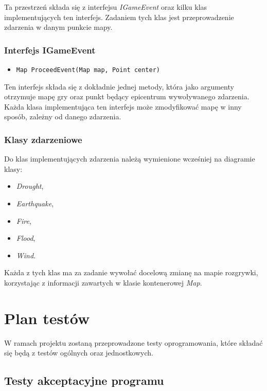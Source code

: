 \documentclass[a4paper,12pt]{article}
\newcommand\tab[1][0.6cm]{\hspace*{#1} }
\begin{document}
\tab Ta przestrzeń składa się z interfejsu \textit{IGameEvent} oraz kilku klas implementujących ten interfejs. Zadaniem tych klas jest przeprowadzenie zdarzenia w danym punkcie mapy.

\subsubsection{Interfejs IGameEvent}

\begin{itemize}
\item \begin{lstlisting}
Map ProceedEvent(Map map, Point center)
\end{lstlisting}
\end{itemize}

Ten interfejs składa się z dokładnie jednej metody, która jako argumenty otrzymuje mapę gry oraz punkt będący epicentrum wywoływanego zdarzenia. Każda klasa implementująca ten interfejs może zmodyfikować mapę w inny sposób, zależny od danego zdarzenia.


\subsubsection{Klasy zdarzeniowe}

\tab Do klas implementujących zdarzenia należą wymienione wcześniej na diagramie klasy:

\begin{itemize}
\item \textit{Drought},
\item \textit{Earthquake},
\item \textit{Fire},
\item \textit{Flood},
\item \textit{Wind}.
\end{itemize}

Każda z tych klas ma za zadanie wywołać docelową zmianę na mapie rozgrywki, korzystając z informacji zawartych w klasie kontenerowej \textit{Map}.

\section{Plan testów}

\tab W ramach projektu zostaną przeprowadzone testy oprogramowania, które składać się będą z testów ogólnych oraz jednostkowych. 


\subsection{Testy akceptacyjne programu}
\end{document}
